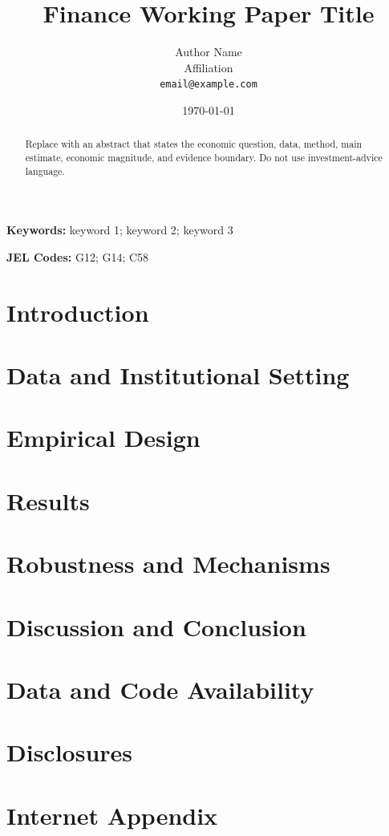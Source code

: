 \documentclass[11pt]{article}
\title{Finance Working Paper Title}
\author{Author Name\\Affiliation\\\texttt{email@example.com}}
\date{\today}
\begin{document}
\maketitle

\begin{abstract}
Replace with an abstract that states the economic question, data, method, main estimate, economic
magnitude, and evidence boundary. Do not use investment-advice language.
\end{abstract}

\noindent\textbf{Keywords:} keyword 1; keyword 2; keyword 3

\noindent\textbf{JEL Codes:} G12; G14; C58

\section{Introduction}

\section{Data and Institutional Setting}

\section{Empirical Design}

\section{Results}

\section{Robustness and Mechanisms}

\section{Discussion and Conclusion}

\section*{Data and Code Availability}

\section*{Disclosures}




\clearpage
\appendix
\section{Internet Appendix}
\end{document}
